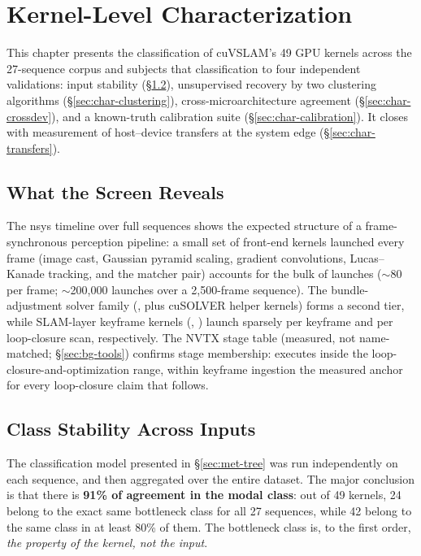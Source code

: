 \chapter{Kernel-Level Characterization}
\label{ch:characterization}

This chapter presents the classification of cuVSLAM's 49 GPU kernels across the 27-sequence corpus and subjects that classification to four independent validations: input stability (\S\ref{sec:char-stability}), unsupervised recovery by two clustering algorithms (\S\ref{sec:char-clustering}), cross-microarchitecture agreement (\S\ref{sec:char-crossdev}), and a known-truth calibration suite (\S\ref{sec:char-calibration}). It closes with measurement of host--device transfers at the system edge (\S\ref{sec:char-transfers}).

\section{What the Screen Reveals}

The nsys timeline over full sequences shows the expected structure of a frame-synchronous perception pipeline: a small set of front-end kernels launched every frame (image cast, Gaussian pyramid scaling, gradient convolutions, Lucas--Kanade tracking, and the matcher pair) accounts for the bulk of launches ($\sim$80 per frame; $\sim$200{,}000 launches over a 2{,}500-frame sequence). The bundle-adjustment solver family (, plus cuSOLVER helper kernels) forms a second tier, while SLAM-layer keyframe kernels (\stBuild{}, \stTrack{}) launch sparsely per keyframe and per loop-closure scan, respectively. The NVTX stage table (measured, not name-matched; \S\ref{sec:bg-tools}) confirms stage membership: \stTrack{} executes inside the loop-closure-and-optimization range, \stBuild{} within keyframe ingestion the measured anchor for every loop-closure claim that follows.

\section{Class Stability Across Inputs}
\label{sec:char-stability}

The classification model presented in \S\ref{sec:met-tree} was run independently on each sequence, and then aggregated over the entire dataset. The major conclusion is that there is \textbf{91\% of agreement in the modal class}: out of 49 kernels, 24 belong to the exact same bottleneck class for all 27 sequences, while 42 belong to the same class in at least 80\% of them. The bottleneck class is, to the first order, \emph{the property of the kernel, not the input}.

